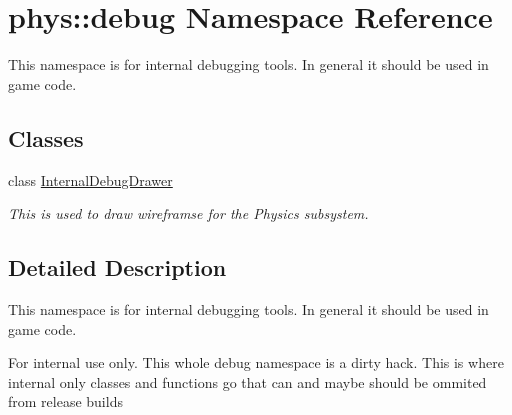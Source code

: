 \hypertarget{namespacephys_1_1debug}{
\section{phys::debug Namespace Reference}
\label{d0/d53/namespacephys_1_1debug}
}


This namespace is for internal debugging tools. In general it should be used in game code.  


\subsection*{Classes}
\begin{DoxyCompactItemize}
\item 
class \hyperlink{classphys_1_1debug_1_1InternalDebugDrawer}{InternalDebugDrawer}
\begin{DoxyCompactList}\small\item\em This is used to draw wireframse for the Physics subsystem. \item\end{DoxyCompactList}\end{DoxyCompactItemize}


\subsection{Detailed Description}
This namespace is for internal debugging tools. In general it should be used in game code. \begin{DoxyInternal}{For internal use only.}
This whole debug namespace is a dirty hack. This is where internal only classes and functions go that can and maybe should be ommited from release builds \end{DoxyInternal}
